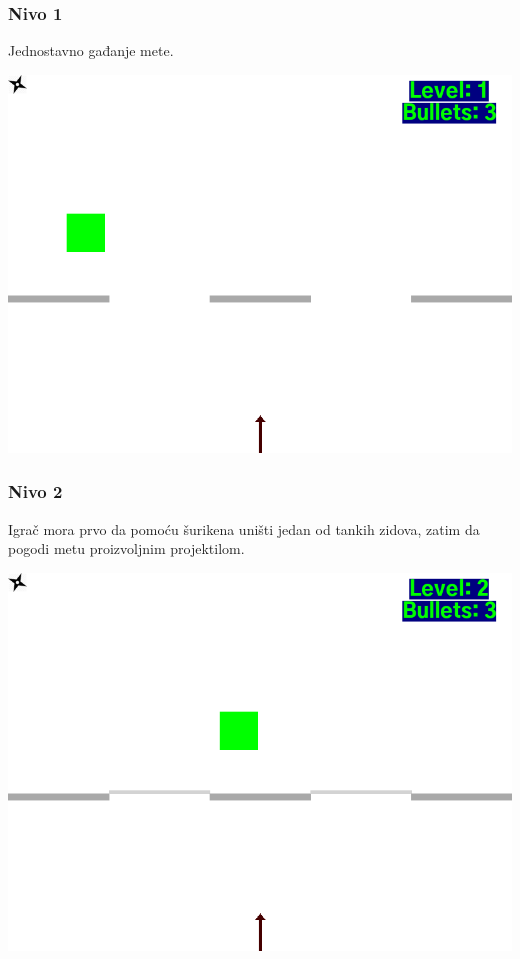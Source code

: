 \documentclass{beamer}
\begin{document}
\begin{frame}
	\frametitle{Nivo 1}
	\Large
	Jednostavno gađanje mete.
	
	\vspace{0.5cm}
	
	\begin{center}
		\includegraphics[scale=0.25]{./images/lvl1.png}
	\end{center}
\end{frame}
\begin{frame}
	\frametitle{Nivo 2}
	\Large
	Igrač mora prvo da pomoću šurikena uništi jedan od tankih zidova, zatim da pogodi metu proizvoljnim projektilom.
	
	\vspace{0.5cm}
	
	\begin{center}
		\includegraphics[scale=0.25]{./images/lvl2.png}
	\end{center}
\end{frame}
\end{document}
